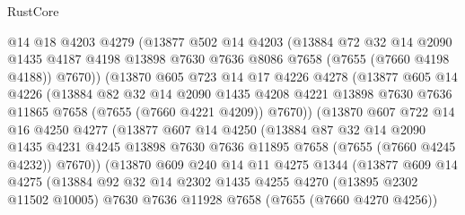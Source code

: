 \begin{lexlean}{RustCore}
\begin{coremodule}
              @14
              @18
              @4203
              @4279
              (@13877
                @502
                @14
                @4203
                (@13884
                  @72
                  @32
                  @14
                  @2090
                  @1435
                  @4187
                  @4198
                  @13898
                  @7630
                  @7636
                  @8086
                  @7658
                  (@7655 (@7660 @4198 @4188))
                  @7670))
              (@13870
                @605
                @723
                @14
                @17
                @4226
                @4278
                (@13877
                  @605
                  @14
                  @4226
                  (@13884
                    @82
                    @32
                    @14
                    @2090
                    @1435
                    @4208
                    @4221
                    @13898
                    @7630
                    @7636
                    @11865
                    @7658
                    (@7655 (@7660 @4221 @4209))
                    @7670))
                (@13870
                  @607
                  @722
                  @14
                  @16
                  @4250
                  @4277
                  (@13877
                    @607
                    @14
                    @4250
                    (@13884
                      @87
                      @32
                      @14
                      @2090
                      @1435
                      @4231
                      @4245
                      @13898
                      @7630
                      @7636
                      @11895
                      @7658
                      (@7655 (@7660 @4245 @4232))
                      @7670))
                  (@13870
                    @609
                    @240
                    @14
                    @11
                    @4275
                    @1344
                    (@13877
                      @609
                      @14
                      @4275
                      (@13884
                        @92
                        @32
                        @14
                        @2302
                        @1435
                        @4255
                        @4270
                        (@13895 @2302 @11502 @10005)
                        @7630
                        @7636
                        @11928
                        @7658
                        (@7655 (@7660 @4270 @4256))

\end{coremodule}
\end{lexlean}
